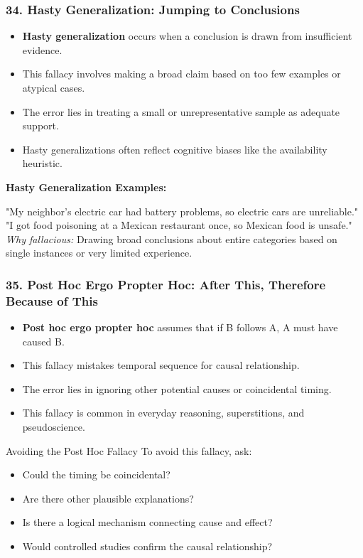 \documentclass{beamer}
\begin{document}
\begin{frame}
\frametitle{34. Hasty Generalization: Jumping to Conclusions}
\begin{itemize}
    \item \textbf{Hasty generalization} occurs when a conclusion is drawn from insufficient evidence.
    \item This fallacy involves making a broad claim based on too few examples or atypical cases.
    \item The error lies in treating a small or unrepresentative sample as adequate support.
    \item Hasty generalizations often reflect cognitive biases like the availability heuristic.
\end{itemize}

\begin{example}
\textbf{Hasty Generalization Examples:}
\scriptsize

"My neighbor's electric car had battery problems, so electric cars are unreliable." \\

"I got food poisoning at a Mexican restaurant once, so Mexican food is unsafe." \\

\textit{Why fallacious:} Drawing broad conclusions about entire categories based on single instances or very limited experience.
\end{example}
\end{frame}

\begin{frame}
\frametitle{35. Post Hoc Ergo Propter Hoc: After This, Therefore Because of This}
\begin{itemize}
    \item \textbf{Post hoc ergo propter hoc} assumes that if B follows A, A must have caused B.
    \item This fallacy mistakes temporal sequence for causal relationship.
    \item The error lies in ignoring other potential causes or coincidental timing.
    \item This fallacy is common in everyday reasoning, superstitions, and pseudoscience.
\end{itemize}

\begin{block}{Avoiding the Post Hoc Fallacy}
    To avoid this fallacy, ask:
    \begin{itemize}
        \item Could the timing be coincidental?
        \item Are there other plausible explanations?
        \item Is there a logical mechanism connecting cause and effect?
        \item Would controlled studies confirm the causal relationship?
    \end{itemize}
\end{block}
\end{frame}
\end{document}

